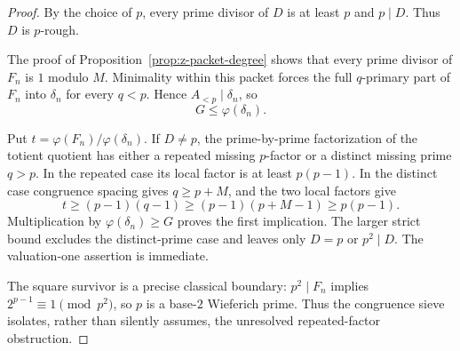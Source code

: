 \documentclass[11pt]{article}
\theoremstyle{definition}
\theoremstyle{remark}
\begin{document}
\begin{proof}
By the choice of $p$, every prime divisor of $D$ is at least $p$ and
$p\mid D$.  Thus $D$ is $p$-rough.

The proof of Proposition~\ref{prop:z-packet-degree} shows that every prime
divisor of $F_n$ is $1$ modulo $M$.  Minimality within this packet forces the
full $q$-primary part of $F_n$ into $\delta_n$ for every $q<p$.  Hence
$A_{<p}\mid\delta_n$, so
\[
 G\leq\varphi(\delta_n).
\]

Put $t=\varphi(F_n)/\varphi(\delta_n)$.  If $D\ne p$, the prime-by-prime
factorization of the totient quotient has either a repeated missing
$p$-factor or a distinct missing prime $q>p$.  In the repeated case its
local factor is at least $p(p-1)$.  In the distinct case congruence spacing
gives $q\geq p+M$, and the two local factors give
\[
 t\geq(p-1)(q-1)\geq(p-1)(p+M-1)\geq p(p-1).
\]
Multiplication by $\varphi(\delta_n)\geq G$ proves the first implication.
The larger strict bound excludes the distinct-prime case and leaves only
$D=p$ or $p^2\mid D$.  The valuation-one assertion is immediate.

The square survivor is a precise classical boundary: $p^2\mid F_n$ implies
$2^{p-1}\equiv1\pmod {p^2}$, so $p$ is a base-$2$ Wieferich prime.  Thus
the congruence sieve isolates, rather than silently assumes, the unresolved
repeated-factor obstruction.
\end{proof}
\end{document}
